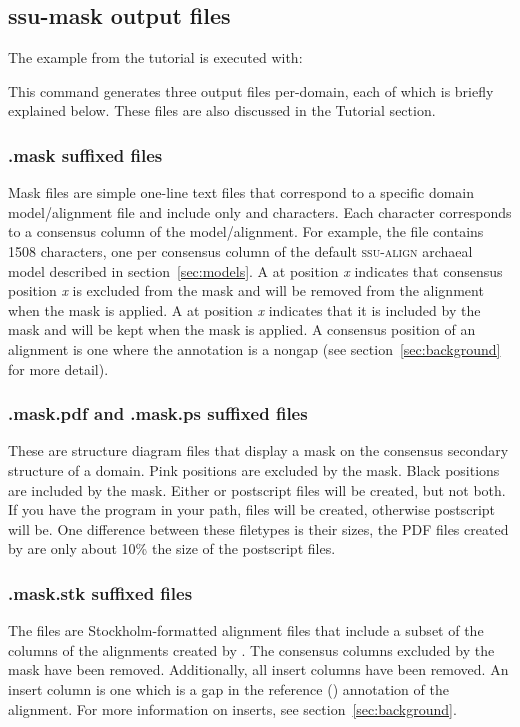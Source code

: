 \subsection{ssu-mask output files}

The  example from the tutorial is executed with:


This command generates three output files per-domain, each of which is
briefly explained below. These files are also discussed in the
Tutorial section. 

\subsubsection{.mask suffixed files}
Mask files are simple one-line text files that correspond to a
specific domain model/alignment file and include only  and
 characters. Each character corresponds to a consensus column
of the model/alignment. For example, the
 file contains 1508 characters, one per
consensus column of the default \textsc{ssu-align} archaeal model
described in section~\ref{sec:models}. A  at position \emph{x}
indicates that consensus position \emph{x} is excluded from the mask
and will be removed from the alignment when the mask is applied. A
 at position \emph{x} indicates that it is included by the
mask and will be kept when the mask is applied. A consensus position
of an alignment is one where the  annotation is a
nongap (see section~\ref{sec:background} for more detail).

\subsubsection{.mask.pdf and .mask.ps suffixed files}
These are structure diagram files that display a mask on the consensus
secondary structure of a domain. Pink positions are excluded by the
mask. Black positions are included by the mask. Either  or
postscript  files will be created, but not both. If you have
the program  in your path,  files will be
created, otherwise postscript will be. One difference between
these filetypes is their sizes, the PDF files created by
 are only about 10\% the size of the postscript files.

\subsubsection{.mask.stk suffixed files}
The  files are Stockholm-formatted alignment files
that include a subset of the columns of the alignments created by
. The consensus columns excluded by the mask have been
removed. Additionally, all insert columns have been removed. An insert
column is one which is a gap in the reference ()
annotation of the alignment. For more information on inserts, see
section~\ref{sec:background}.


